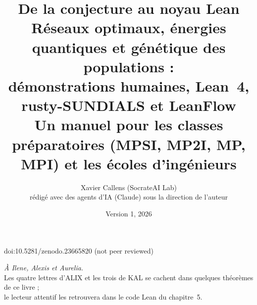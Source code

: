 \documentclass[11pt,a4paper,openany]{book}
\title{\textbf{De la conjecture au noyau Lean}\\[0.5em]
\large Réseaux optimaux, énergies quantiques et génétique des populations :\\ démonstrations humaines, Lean~4, rusty-SUNDIALS et LeanFlow\\[0.5em]
\normalsize Un manuel pour les classes préparatoires (MPSI, MP2I, MP, MPI) et les écoles d'ingénieurs}
\author{Xavier Callens (SocrateAI Lab)\\[0.3em]\small rédigé avec des agents d'IA (Claude) sous la direction de l'auteur}
\date{Version 1, 2026}
\theoremstyle{plain}
\theoremstyle{definition}
\theoremstyle{remark}
\begin{document}
\frontmatter
\maketitle
\begin{center}\small doi:10.5281/zenodo.23665820 \quad (not peer reviewed)\end{center}

\thispagestyle{empty}
\vspace*{\fill}
\begin{center}
\Large\emph{À Ilene, Alexis et Aurelia.}\\[1em]
\normalsize Les quatre lettres d'ALIX et les trois de KAL se cachent dans quelques théorèmes de ce livre ;\\
le lecteur attentif les retrouvera dans le code Lean du chapitre~5.
\end{center}
\vspace*{\fill}
\clearpage

\tableofcontents
\mainmatter






\appendix






\backmatter

\end{document}
